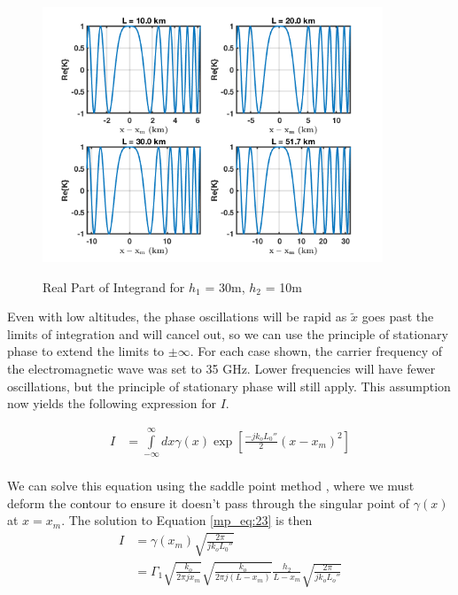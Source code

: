\begin{figure}[H]
  \begin{center}
\includegraphics[width=4in]{../media/analysis/phaseVariation_30_50}
  \end{center}
  \renewcommand{\baselinestretch}{1} \small\normalsize
  \begin{quote}
  \caption[Real Part of Integrand for $h_1$ = 30m, $h_2$ = 50m]{ Real Part of Integrand for $h_1$ = 30m, $h_2$ = 10m\label{mp_fig:5}}
  \end{quote}
\end{figure}
\renewcommand{\baselinestretch}{2} \small\normalsize

Even with low altitudes, the phase oscillations will be rapid as $\tilde{x}$ goes past the limits of integration and will cancel out, so we can use the principle of stationary phase to extend the limits to $\pm\infty$. For each case shown, the carrier frequency of the electromagnetic wave was set to 35 GHz. Lower frequencies will have fewer oscillations, but the principle of stationary phase will still apply. This assumption now yields the following expression for $I$.

\begin{equation}
\begin{aligned}
I&=\int\limits_{-\infty}^{\infty}dx\gamma(x)\exp\left[\frac{-jk_oL_0''}{2}(x-x_m)^2\right]\\
\end{aligned}
\label{mp_eq:23}
\end{equation}

We can solve this equation using the saddle point method \cite{frazier_green} \cite{arfken_weber}, where we must deform the contour to ensure it doesn't pass through the singular point of $\gamma (x)$ at $x=x_m$. The solution to Equation \ref{mp_eq:23} is then
\begin{equation}
\begin{aligned}
I&=\gamma(x_m)\sqrt{\frac{2\pi}{jk_oL_0''}}\\
&=\Gamma_1 \sqrt{\frac{k_o}{2\pi jx_m}}\sqrt{\frac{k_o}{2\pi j (L-x_m)}}\frac{h_2}{L-x_m}\sqrt{\frac{2\pi}{jk_oL_o''}}\\
\end{aligned}
\label{mp_eq:23a}
\end{equation}

